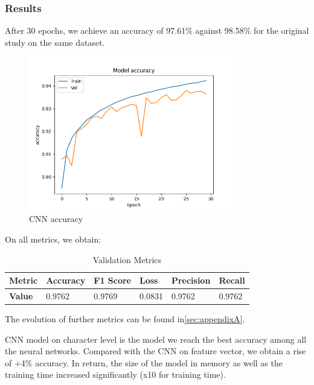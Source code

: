 \documentclass{article}
\begin{document}
    \subsubsection{Results}

    After 30 epochs, we achieve an accuracy of 97.61\% against 98.58\% for the original study\cite{CharacterLevelCNN} on the same dataset.
    \begin{figure}[H]
        \centering
        \includegraphics[width=0.8\textwidth]{report_img/nn_results/feature_vector_cnn_26/metric_accuracy}
        \caption{CNN accuracy}
        \label{fig:}
    \end{figure}

    On all metrics, we obtain:
    \begin{table}[H]
        \centering
        \begin{tabular}{|l|l|l|l|l|l|}
            \hline
            \textbf{Metric} & \textbf{Accuracy} & \textbf{F1 Score} & \textbf{Loss} & \textbf{Precision} & \textbf{Recall} \\ \hline
            \textbf{Value}  & 0.9762            & 0.9769            & 0.0831        & 0.9762             & 0.9762          \\ \hline
        \end{tabular}
        \caption{Validation Metrics}
        \label{tab:validation_metrics}
    \end{table}

    The evolution of further metrics can be found in\ref{sec:appendixA}.

    CNN model on character level is the model we reach the best accuracy among all the neural networks.
    Compared with the CNN on feature vector, we obtain a rise of +4\% accuracy.
    In return, the size of the model in memory as well as the training time increased significantly (x10 for training time).
\end{document}
